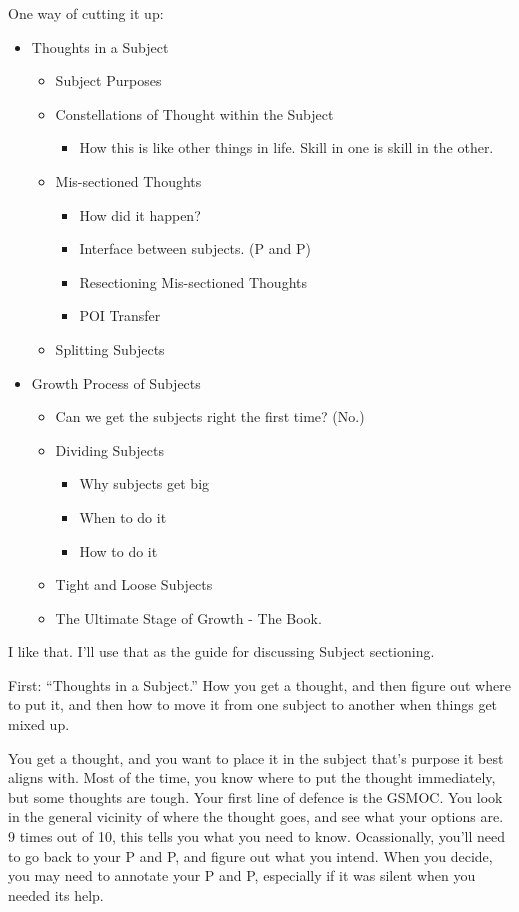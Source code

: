 \documentclass[oneside]{book}
\begin{document}
One way of cutting it up:

\begin{itemize}
\item Thoughts in a Subject
\begin{itemize}
  \item Subject Purposes
  \item Constellations of Thought within the Subject
\begin{itemize}
    \item How this is like other things in life.
      Skill in one is skill in the other.
\end{itemize}
  \item Mis-sectioned Thoughts
\begin{itemize}
    \item How did it happen?
    \item Interface between subjects. (P and P)
    \item Resectioning Mis-sectioned Thoughts
    \item POI Transfer
\end{itemize}
  \item Splitting Subjects
\end{itemize}
\item Growth Process of Subjects
\begin{itemize}
  \item Can we get the subjects right the first time? (No.)
  \item Dividing Subjects
\begin{itemize}
    \item Why subjects get big
    \item When to do it
    \item How to do it
\end{itemize}
  \item Tight and Loose Subjects
  \item The Ultimate Stage of Growth - The Book.
\end{itemize}
\end{itemize}

I like that. I'll use that as the guide for discussing Subject
sectioning.

First: ``Thoughts in a Subject.'' How you get a thought, and then figure
out where to put it, and then how to move it from one subject to
another when things get mixed up.

You get a thought, and you want to place it in the subject that's
purpose it best aligns with. Most of the time, you know where to
put the thought immediately, but some thoughts are tough. Your first
line of defence is the GSMOC. You look in the general vicinity of
where the thought goes, and see what your options are. 9 times out of
10, this tells you what you need to know. Ocassionally, you'll need to
go back to your P and P, and figure out what you intend. When you decide,
you may need to annotate your P and P, especially if it was silent when
you needed its help.
\end{document}
